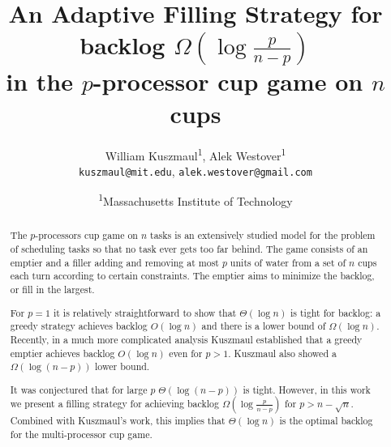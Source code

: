 \documentclass[twocolumn,11pt]{article}
\author{William Kuszmaul\textsuperscript{1}, Alek
Westover\textsuperscript{1}\\ 
\texttt{kuszmaul@mit.edu}, \texttt{alek.westover@gmail.com} }
\title{An Adaptive Filling Strategy for backlog
$\Omega(\log \frac{p}{n-p})$ \\ in the $p$-processor cup game on $n$ cups}
\date{\textsuperscript{1}Massachusetts Institute of Technology}
\begin{document}
\maketitle
\begin{abstract}
  The $p$-processors cup game on $n$ tasks is an extensively
  studied model for the problem of scheduling tasks so that no
  task ever gets too far behind. The game consists of an emptier
  and a filler adding and removing at most $p$ units of water
  from a set of $n$ cups each turn according to certain
  constraints. The emptier aims to minimize the backlog, or fill
  in the largest.

  For $p=1$ it is relatively straightforward to show that
  $\Theta(\log n)$ is tight for backlog: a greedy strategy
  achieves backlog $O(\log n)$ and there is a lower bound of
  $\Omega(\log n)$.
  Recently, in a much more complicated analysis
  Kuszmaul\cite{ku20}
  established that a greedy emptier achieves backlog $O(\log n)$
  even for $p>1$. Kuszmaul also showed a $\Omega(\log (n-p))$
  lower bound.

  It was conjectured that for large $p$ $\Theta(\log (n-p))$ is
  tight. However, in this work we present a filling strategy for
  achieving backlog $\Omega(\log \frac{p}{n-p})$ for $p> n-\sqrt{n}$.
  Combined with Kuszmaul's work, this implies that $\Theta(\log
  n)$ is the optimal backlog for the multi-processor cup game.


\end{abstract}
\end{document}
